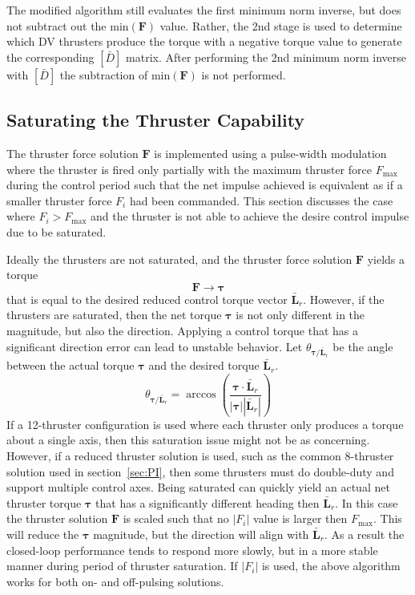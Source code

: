The modified algorithm still evaluates the first minimum norm inverse, but does not subtract out the $\text{min}(\bm F)$ value.  Rather, the 2nd stage is used to determine which DV thrusters produce the torque with a negative torque value to generate the corresponding $[\bar D]$ matrix.  After performing the 2nd minimum norm inverse with $[\bar D]$ the subtraction of  $\text{min}(\bm F)$ is not performed.  




\subsection{Saturating the Thruster Capability}
The thruster force solution $\bm F$ is implemented using a pulse-width modulation where the thruster is fired only partially with the maximum thruster force $F_{\text{max}}$ during the control period such that the net impulse achieved is equivalent as if a smaller thruster force $F_{i}$ had been commanded.  This section discusses the case where $F_{i}>F_{\text{max}}$ and the thruster is not able to achieve the desire control impulse due to be saturated.  

Ideally the thrusters are not saturated, and the thruster force solution $\bm F$ yields a torque
\begin{equation*}
	[D]\bm F \rightarrow \bm\tau
\end{equation*}
that is equal to the desired reduced control torque vector $\bar{\bm L}_{r}$.  However, if the thrusters are saturated, then the net torque $\bm\tau$ is not only different in the magnitude, but also the direction.  Applying a control torque that has a significant direction error can lead to unstable behavior.  Let $\theta_{\bm\tau/\bar{\bm L}_{r}}$ be the angle between the actual torque $\bm\tau$ and the desired torque $\bar{\bm L}_{r}$. 
\begin{equation}
	\theta_{\bm\tau/\bar{\bm L}_{r}} = \arccos \left( \frac{\bm\tau \cdot \bar{\bm L}_{r}}{|\bm\tau| |\bar{\bm L}_{r}|} \right)
\end{equation}
If a 12-thruster configuration is used where each thruster only produces a torque about a single axis, then this saturation issue might not be as concerning.  However, if a reduced thruster solution is used, such as the common 8-thruster solution used in section~\ref{sec:PI}, then some thrusters must do double-duty and support multiple control axes.  Being saturated can quickly yield an actual net thruster torque $\bm \tau$ that has a significantly different heading then $\bar{\bm L}_{r}$.  In this case the thruster solution $\bm F$ is scaled such that no $|F_{i}|$ value is larger  then $F_{\text{max}}$.  This will reduce the $\bm\tau$ magnitude, but the direction will align with $\bar{\bm L}_{r}$.  As a result the closed-loop performance tends to respond more slowly, but in a more stable manner during period of thruster saturation.  If $|F_{i}|$ is used, the above algorithm works for both on- and off-pulsing solutions.  

